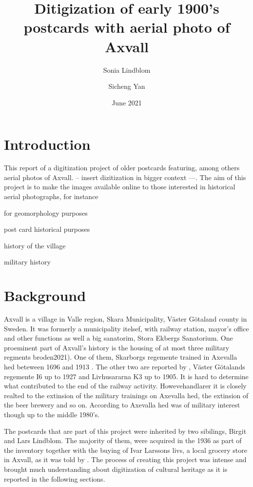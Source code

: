 \documentclass[12 pt]{paper}
\title{%
Ditigization of early 1900's  postcards with aerial photo of Axvall }
\author{Sonia Lindblom \and Sicheng Yan}
\date{June 2021}
\begin{document}


\section{Introduction}
This report of a digitization project of older postcards featuring, among others aerial photos of Axvall. -- insert dizitization in  bigger context ---. The aim of this project is to make the images available online to those interested in historical aerial photographs, for instance 
\begin{inparaenum}[i)]
	\item for geomorphology purposes \autocite[cf.][]{gomez2015}
	\item post card historical purposes
	\item history of the village
	\item military history
\end{inparaenum}


 
\section{Background}
Axvall is a village in Valle region, Skara Municipality, Väster Götaland county in Sweden. It was formerly a municipality itelsef, with railway station, mayor's office and other functions as well a big sanatorim, Stora Ekbergs Sanatorium. One proeminent part of Axvall's history is the housing of at most three military regments \autocite[]{broden2021} broden2021). One of them, Skarborgs regemente trained in Axevalla hed beteween 1696 and 1913 \autocite{frykmer1992}. The other two are reported by \textcite{broden2021}, Väster Götalands regemente I6 up to 1927 and Livhusararna K3 up to 1905. It is hard to determine what contributed to the end of the railway activity. Howevehandlarer it is closely realted to the extinsion of the military trainings on Axevalla hed, the extinsion of the beer brewery and so on. According to \textcite[]{broden2021} Axevalla hed was of military interest though up to the middle 1980's.

The postcards that are part of this project were inherited by two sibilings, Birgit and Lars Lindblom. The majority of them, were acquired in the 1936 as part of the inventory together with the buying of Ivar Larssons livs, a local grocery store in Axvall, as it was told by \autocite[]{Lars}. The process of creating this project was intense and brought much understanding about digitization of cultural heritage as it is reported in the following sections. 
\end{document}
